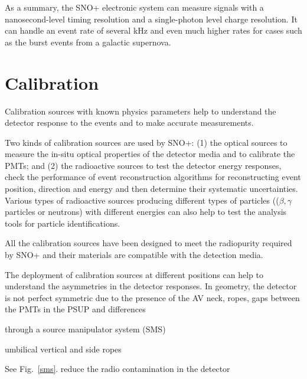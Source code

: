 As a summary, the SNO+ electronic system can measure signals with a nanosecond-level timing resolution and a single-photon level charge resolution. It can handle an event rate of several kHz and even much higher rates for cases such as the burst events from a galactic supernova\cite{snop_jinst}.

\section{Calibration}\label{sect:calibr}
Calibration sources with known physics parameters help to understand the detector response to the events and to make accurate measurements.

Two kinds of calibration sources are used by SNO+: (1) the optical sources to measure the in-situ optical properties of the detector media and to calibrate the PMTs; and (2) the radioactive sources to test the detector energy responses, check the performance of event reconstruction algorithms for reconstructing event position, direction and energy and then determine their systematic uncertainties. Various types of radioactive sources producing different types of particles (($\beta,\gamma$ particles or neutrons) with different energies can also help to test the analysis tools for particle identifications.

All the calibration sources have been designed to meet the radiopurity required by SNO+ and their materials are compatible with the detection media\cite{snop_jinst}.

The deployment of calibration sources at different positions can help to understand the asymmetries in the detector responses. In geometry, the detector is not perfect symmetric due to the presence of the AV neck, ropes, gaps between the PMTs in the PSUP and differences    

through a source manipulator system (SMS)

umbilical vertical and side ropes


See Fig.~\ref{sms}.
reduce the radio contamination in the detector

